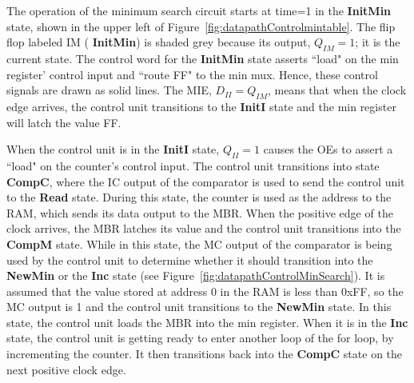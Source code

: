 The operation of the minimum search circuit starts at time=1
in the \textbf{ InitMin} state, shown in the upper left of
Figure~\ref{fig:datapathControlmintable}.  The flip flop labeled IM (\textbf{ InitMin})
is shaded grey because its output, $Q_{IM}=1$; it is the current state.
The control word for the \textbf{ InitMin} state asserts ``load" on the
min register' control input and ``route FF" to the min mux. Hence,
these control signals are drawn as solid lines.
The MIE, $D_{II} = Q_{IM}$, means that when the clock edge
arrives, the control unit transitions to the \textbf{ InitI}
state and the min register will latch the value FF.

When the control unit is in the \textbf{ InitI} state, $Q_{II}=1$
causes the OEs to assert a ``load" on the counter's control
input.  The control unit transitions into state \textbf{ CompC},
where the IC output of the comparator is used
to send the control unit to the \textbf{ Read} state.
During this state, the counter is used as the address to
the RAM, which sends its data output to the MBR.  When the
positive edge of the clock arrives, the MBR latches its
value and the control unit transitions into the \textbf{ CompM}
state.  While in this state, the MC output of the comparator
is being used by the control unit to determine whether it
should transition into the \textbf{ NewMin} or the \textbf{ Inc} state
(see Figure~\ref{fig:datapathControlMinSearch}).  It is assumed that the
value stored at address 0 in the RAM is less than 0xFF, so
the MC output is 1 and the control unit transitions to the
\textbf{ NewMin} state.  In this state, the control
unit loads the MBR into the min register.  When it is in the \textbf{ Inc}
state, the control unit is getting ready to enter another loop of the
for loop, by incrementing the counter.  It then transitions
back into the \textbf{ CompC} state on the next positive clock edge.

